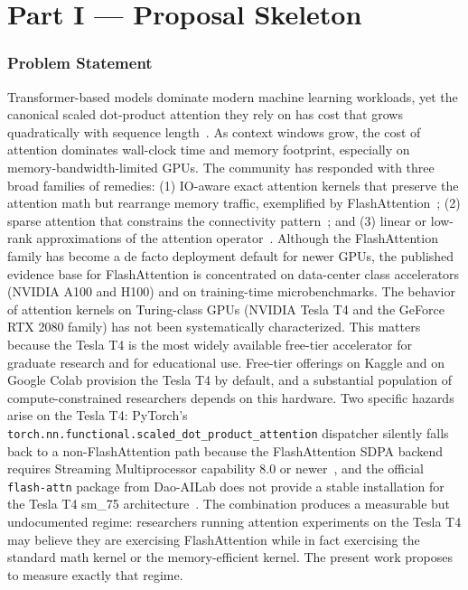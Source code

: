 \documentclass[11pt]{article}
\begin{document}
\newpage

\part*{Part I --- Proposal Skeleton}

\section{Problem Statement}

Transformer-based models dominate modern machine learning workloads, yet the canonical scaled dot-product attention they rely on has cost that grows quadratically with sequence length~\parencite{vaswani2023attentionneed}. As context windows grow, the cost of attention dominates wall-clock time and memory footprint, especially on memory-bandwidth-limited GPUs. The community has responded with three broad families of remedies: (1) IO-aware exact attention kernels that preserve the attention math but rearrange memory traffic, exemplified by FlashAttention~\parencite{dao2022flashattentionfastmemoryefficientexact, dao2023flashattention2fasterattentionbetter, shah2024flashattention3fastaccurateattention}; (2) sparse attention that constrains the connectivity pattern~\parencite{beltagy2020longformerlongdocumenttransformer, zaheer2021bigbirdtransformerslonger}; and (3) linear or low-rank approximations of the attention operator~\parencite{wang2020linformerselfattentionlinearcomplexity, choromanski2022rethinkingattentionperformers, xiong2021nystromformernystrombasedalgorithmapproximating}. Although the FlashAttention family has become a de facto deployment default for newer GPUs, the published evidence base for FlashAttention is concentrated on data-center class accelerators (NVIDIA A100 and H100) and on training-time microbenchmarks. The behavior of attention kernels on Turing-class GPUs (NVIDIA Tesla T4 and the GeForce RTX 2080 family) has not been systematically characterized. This matters because the Tesla T4 is the most widely available free-tier accelerator for graduate research and for educational use. Free-tier offerings on Kaggle and on Google Colab provision the Tesla T4 by default, and a substantial population of compute-constrained researchers depends on this hardware. Two specific hazards arise on the Tesla T4: PyTorch's \texttt{torch.nn.functional.scaled\_dot\_product\_attention} dispatcher silently falls back to a non-FlashAttention path because the FlashAttention SDPA backend requires Streaming Multiprocessor capability 8.0 or newer~\parencite{pytorch2024sdpa}, and the official \texttt{flash-attn} package from Dao-AILab does not provide a stable installation for the Tesla T4 sm\_75 architecture~\parencite{flashattn_t4_issue887}. The combination produces a measurable but undocumented regime: researchers running attention experiments on the Tesla T4 may believe they are exercising FlashAttention while in fact exercising the standard math kernel or the memory-efficient kernel. The present work proposes to measure exactly that regime.
\end{document}
